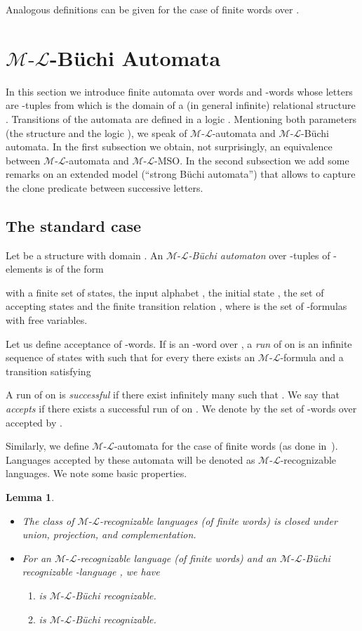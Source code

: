 \documentclass[copyright,creativecommons]{eptcs}
\newtheorem{lemma}[theorem]{Lemma}
\theoremstyle{plain}
\theoremstyle{nonumberplain}
\newcommand{\m}{\ensuremath{\mathcal{M}}}
\newcommand{\el}{\ensuremath{\mathcal{L}}}
\newcommand{\ml}{\ensuremath{\m\textrm{-}\el}}
\begin{document}
Analogous definitions can be given for the case of finite words over . 



\section{\ml-B{\"u}chi Automata}\label{sec_mlaut}




In this section we introduce finite automata over words and -words 
whose letters are -tuples from  which is the  
domain of a (in general infinite) relational structure . 
Transitions of the automata are defined in 
a logic . Mentioning both parameters (the structure  and the logic ), 
we speak of \ml-automata and \ml-B\"uchi automata. In the first subsection we obtain, 
not surprisingly, an 
equivalence between \ml-automata and \ml-MSO. In the second subsection we add some 
remarks  on an extended model (``strong B\"uchi automata'') that allows to capture 
the clone predicate between successive letters. 



\subsection{The standard case}



Let  be a structure with domain . 
An \emph{\ml-B{\"u}chi automaton} over -tuples of -elements is of the form 
 
with a finite set  of states, the input alphabet ,  
the initial state , the set  of accepting states and 
the finite transition relation 
, where  is the set of -formulas with  free variables. 

Let us define acceptance of -words. If 
 is an -word over ,  
a \emph{run} of  on  is an infinite sequence of states 
 with  such that for every  there 
exists an \ml-formula  and a transition  satisfying

A run  of  on  is \emph{successful} 
if there exist infinitely many  such that . We say that  \emph{accepts}  if there exists a successful run of  on . 
We denote by  the set of -words over  accepted by .

Similarly, we define \ml-automata for the case of finite words (as done in~\cite{bes08}). 
Languages accepted by these automata will be denoted as \ml-recognizable languages. 
We note some basic properties. 
\begin{lemma}\label{lem:mlprops}\ 
\begin{itemize}
  \item The class of \ml-recognizable languages (of finite words) is closed under union, projection, and complementation.
  \item For an \ml-recognizable language (of finite words)  and an \ml-B{\"u}chi recognizable -language , we have 
    \begin{enumerate}
    \item  is \ml-B{\"u}chi recognizable.
    \item  is \ml-B{\"u}chi recognizable.
  \end{enumerate}
\end{itemize}
\end{lemma}
\end{document}
